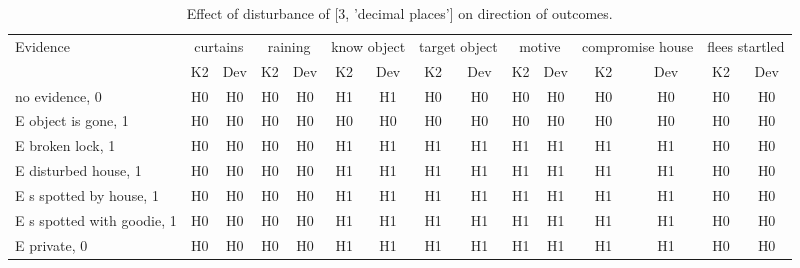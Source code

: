 \begin{table}\begin{tabular}{l|cc|cc|cc|cc|cc|cc|cc}\toprule\multirow{2}{*}{Evidence} & \multicolumn{2}{c}{curtains}& \multicolumn{2}{c}{raining}& \multicolumn{2}{c}{know object}& \multicolumn{2}{c}{target object}& \multicolumn{2}{c}{motive}& \multicolumn{2}{c}{compromise house}& \multicolumn{2}{c}{flees startled}\\& {K2} & {Dev}& {K2} & {Dev}& {K2} & {Dev}& {K2} & {Dev}& {K2} & {Dev}& {K2} & {Dev}& {K2} & {Dev}\\\midrule
no evidence, 0 & H0&H0&H0&H0&H1&H1&H0&H0&H0&H0&H0&H0&H0&H0\\E object is gone, 1 & H0&H0&H0&H0&H0&H0&H0&H0&H0&H0&H0&H0&H0&H0\\E broken lock, 1 & H0&H0&H0&H0&H1&H1&H1&H1&H1&H1&H1&H1&H0&H0\\E disturbed house, 1 & H0&H0&H0&H0&H1&H1&H1&H1&H1&H1&H1&H1&H0&H0\\E s spotted by house, 1 & H0&H0&H0&H0&H1&H1&H1&H1&H1&H1&H1&H1&H0&H0\\E s spotted with goodie, 1 & H0&H0&H0&H0&H1&H1&H1&H1&H1&H1&H1&H1&H0&H0\\E private, 0 & H0&H0&H0&H0&H1&H1&H1&H1&H1&H1&H1&H1&H0&H0\\\bottomrule\end{tabular}\caption{Effect of disturbance of [3, 'decimal places'] on direction of outcomes.}\end{table}